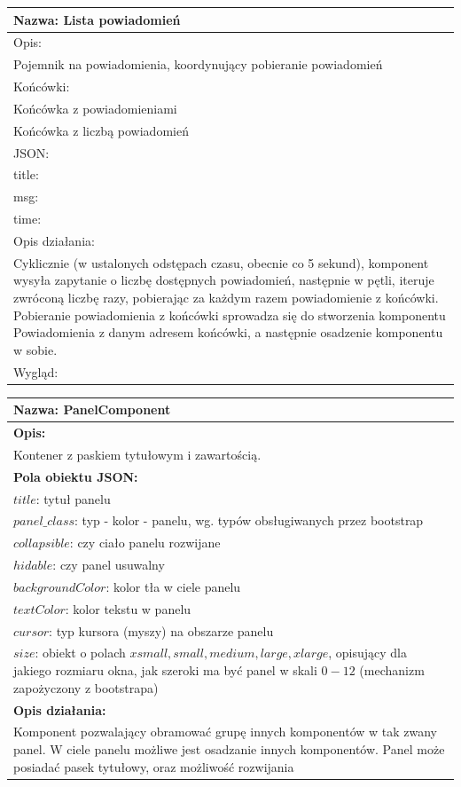\documentclass[licencjacka]{pracamgr}
\begin{document}
\begin{tabularx}{\linewidth}{|X|}\hline
Nazwa:
Lista powiadomień
\\\hline
Opis:\\

Pojemnik na powiadomienia, koordynujący pobieranie powiadomień\\\hline
Końcówki:\\
Końcówka z powiadomieniami\\
Końcówka z liczbą powiadomień
\\\hline
JSON: \\
title: \\
msg:\\
time:\\\hline
Opis działania:\\
Cyklicznie (w ustalonych odstępach czasu, obecnie co 5 sekund), komponent
wysyła zapytanie o liczbę dostępnych powiadomień, następnie w pętli, iteruje zwróconą liczbę razy,
pobierając za każdym razem powiadomienie z końcówki. Pobieranie powiadomienia z końcówki sprowadza się
do stworzenia komponentu Powiadomienia z danym adresem końcówki, a następnie osadzenie komponentu w sobie.\\\hline
Wygląd:\\\hline
\end{tabularx}

\vspace{30pt}

\begin{tabularx}{\linewidth}{|X|}\hline
\textbf{Nazwa:}
PanelComponent
\\\hline
\textbf{Opis:}\\

Kontener z paskiem tytułowym i zawartością.\\
\hline
\textbf{Pola obiektu JSON:} \\
$title$: tytuł panelu\\
$panel\_class$: typ - kolor - panelu, wg. typów obsługiwanych przez bootstrap\\
$collapsible$: czy ciało panelu rozwijane\\
$hidable$: czy panel usuwalny\\
$backgroundColor$: kolor tła w ciele panelu\\
$textColor$: kolor tekstu w panelu\\
$cursor$: typ kursora (myszy) na obszarze panelu\\
$size$: obiekt o polach $xsmall, small, medium, large, xlarge$, opisujący dla jakiego rozmiaru okna, jak szeroki ma być panel w skali $0 - 12$ (mechanizm zapożyczony z bootstrapa)
\\\hline
\textbf{Opis działania:}\\
Komponent pozwalający obramować grupę innych komponentów w tak zwany panel. W ciele panelu możliwe jest osadzanie innych komponentów. Panel może posiadać pasek tytułowy, oraz możliwość rozwijania\\\hline

\end{tabularx}
\end{document}
